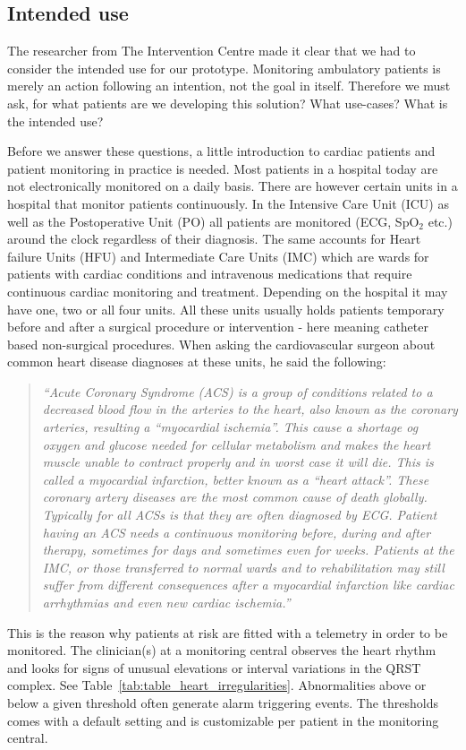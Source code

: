\subsection{Intended use} %
\label{sub:intended_use}

The researcher from The Intervention Centre made it clear that we had to consider the intended use for our prototype. Monitoring ambulatory patients is merely an action following an intention, not the goal in itself. Therefore we must ask, for what patients are we developing this solution? What use-cases? What is the intended use?

Before we answer these questions, a little introduction to cardiac patients and patient monitoring in practice is needed. Most patients in a hospital today are not electronically monitored on a daily basis. There are however certain units in a hospital that monitor patients continuously. In the Intensive Care Unit (ICU) as well as the Postoperative Unit (PO) all patients are monitored (ECG, SpO$_2$ etc.) around the clock regardless of their diagnosis. The same accounts for Heart failure Units (HFU) and Intermediate Care Units (IMC) which are wards for patients with cardiac conditions and intravenous medications that require continuous cardiac monitoring and treatment. Depending on the hospital it may have one, two or all four units. All these units usually holds patients temporary before and after a surgical procedure or intervention - here meaning catheter based non-surgical procedures. When asking the cardiovascular surgeon about common heart disease diagnoses at these units, he said the following: 

\begin{quote} 
\textit{``Acute Coronary Syndrome (ACS) is a group of conditions related to a decreased blood flow in the arteries to the heart, also known as the coronary arteries, resulting a “myocardial ischemia”. This cause a shortage og oxygen and glucose needed for cellular metabolism and makes the heart muscle unable to contract properly and in worst case it will die. This is called a myocardial infarction, better known as a “heart attack”. These coronary artery diseases are the most common cause of death globally. Typically for all ACSs is that they are often diagnosed by ECG. Patient having an ACS needs a continuous monitoring before, during and after therapy, sometimes for days and sometimes even for weeks. Patients at the IMC, or those transferred to normal wards and to rehabilitation may still suffer from different consequences after a myocardial infarction like cardiac arrhythmias and even new cardiac ischemia.''}
\end{quote}
\noindent
This is the reason why patients at risk are fitted with a telemetry in order to be monitored. The clinician(s) at a monitoring central observes the heart rhythm and looks for signs of unusual elevations or interval variations in the QRST complex. See Table~\ref{tab:table_heart_irregularities}. Abnormalities above or below a given threshold often generate alarm triggering events. The thresholds comes with a default setting and is customizable per patient in the monitoring central. 

